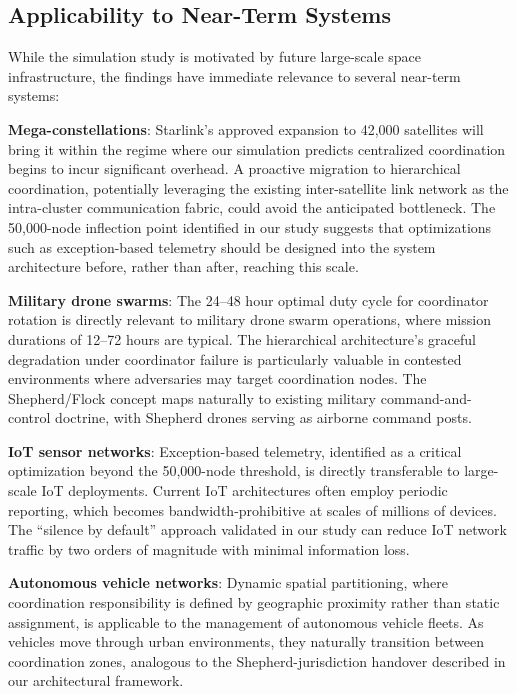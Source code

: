 \documentclass[journal]{IEEEtran}
\begin{document}
\subsection{Applicability to Near-Term Systems}

While the simulation study is motivated by future large-scale space infrastructure, the findings have immediate relevance to several near-term systems:

\textbf{Mega-constellations}: Starlink's approved expansion to 42{,}000 satellites will bring it within the regime where our simulation predicts centralized coordination begins to incur significant overhead. A proactive migration to hierarchical coordination, potentially leveraging the existing inter-satellite link network as the intra-cluster communication fabric, could avoid the anticipated bottleneck. The 50{,}000-node inflection point identified in our study suggests that optimizations such as exception-based telemetry should be designed into the system architecture before, rather than after, reaching this scale.

\textbf{Military drone swarms}: The 24--48 hour optimal duty cycle for coordinator rotation is directly relevant to military drone swarm operations, where mission durations of 12--72 hours are typical. The hierarchical architecture's graceful degradation under coordinator failure is particularly valuable in contested environments where adversaries may target coordination nodes. The Shepherd/Flock concept maps naturally to existing military command-and-control doctrine, with Shepherd drones serving as airborne command posts.

\textbf{IoT sensor networks}: Exception-based telemetry, identified as a critical optimization beyond the 50{,}000-node threshold, is directly transferable to large-scale IoT deployments. Current IoT architectures often employ periodic reporting, which becomes bandwidth-prohibitive at scales of millions of devices. The ``silence by default'' approach validated in our study can reduce IoT network traffic by two orders of magnitude with minimal information loss.

\textbf{Autonomous vehicle networks}: Dynamic spatial partitioning, where coordination responsibility is defined by geographic proximity rather than static assignment, is applicable to the management of autonomous vehicle fleets. As vehicles move through urban environments, they naturally transition between coordination zones, analogous to the Shepherd-jurisdiction handover described in our architectural framework.
\end{document}

